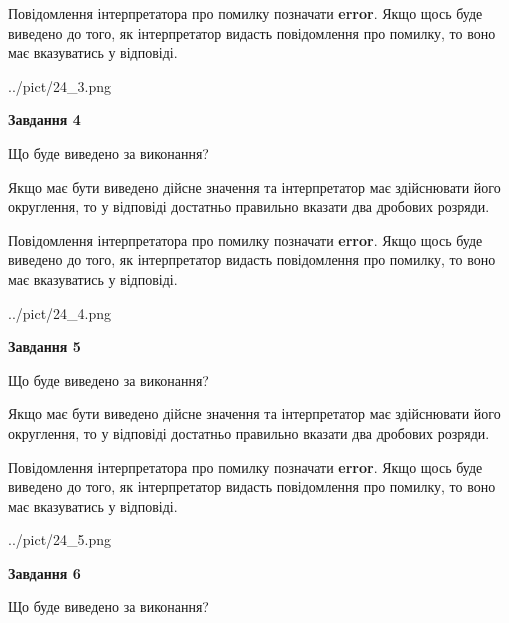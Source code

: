 \documentclass[12pt, ukrainian]{article}
\begin{document}
{\begin {Large}
Повідомлення інтерпретатора про помилку позначати \textbf{error}.
Якщо щось буде виведено до того, як інтерпретатор видасть повідомлення про помилку, 
то воно має вказуватись у відповіді. \par

\begin{center}
	{../pict/24_3.png}
\end{center}
\newpage

{\begin {center}\textbf{Завдання 4}\end {center}}\par
Що буде виведено за виконання? \par

Якщо має бути виведено дійсне значення та інтерпретатор має здійснювати його округлення, 
то у відповіді достатньо правильно вказати два дробових розряди.

Повідомлення інтерпретатора про помилку позначати \textbf{error}.
Якщо щось буде виведено до того, як інтерпретатор видасть повідомлення про помилку, 
то воно має вказуватись у відповіді. \par

\begin{center}
	{../pict/24_4.png}
\end{center}
\newpage

{\begin {center}\textbf{Завдання 5}\end {center}}\par
Що буде виведено за виконання? \par

Якщо має бути виведено дійсне значення та інтерпретатор має здійснювати його округлення, 
то у відповіді достатньо правильно вказати два дробових розряди.

Повідомлення інтерпретатора про помилку позначати \textbf{error}.
Якщо щось буде виведено до того, як інтерпретатор видасть повідомлення про помилку, 
то воно має вказуватись у відповіді. \par

\begin{center}
	{../pict/24_5.png}
\end{center}
\newpage

{\begin {center}\textbf{Завдання 6}\end {center}}\par
Що буде виведено за виконання? \par


\end{Large}}
\end{document}

